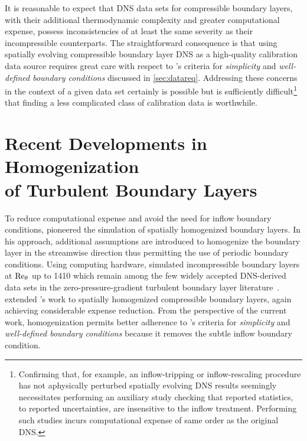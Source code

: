 It is reasonable to expect that DNS data sets for compressible boundary layers,
with their additional thermodynamic complexity and greater computational
expense, possess inconsistencies of at least the same severity as their
incompressible counterparts.
The straightforward consequence is that using spatially evolving compressible
boundary layer DNS as a high-quality calibration data source requires great care
with respect to \citeauthor{Settles1993Hypersonic}'s criteria for
\emph{simplicity} and \emph{well-defined boundary conditions} discussed in
\autoref{sec:datareq}.  Addressing these concerns in the context of a given
data set certainly is possible but is sufficiently difficult\footnote{%
    Confirming that, for example, an inflow-tripping or inflow-rescaling
    procedure has not aphysically perturbed spatially evolving DNS results
    seemingly necessitates performing an auxiliary study checking that reported
    statistics, to reported uncertainties, are insensitive to the
    inflow treatment.  Performing such studies incurs computational expense of
    same order as the original DNS.
}
that finding a less complicated class of calibration data is worthwhile.


\section[Recent Developments in Homogenization of Turbulent Boundary Layers]
        {Recent Developments in Homogenization\\of Turbulent Boundary Layers}
\label{sec:background_homogenization}

To reduce computational expense and avoid the need for inflow boundary conditions,
\citet{Spalart1988Direct} pioneered the simulation of
spatially homogenized boundary layers.  In his approach, additional
assumptions are introduced to homogenize the boundary layer in the
streamwise direction thus permitting the use of periodic boundary conditions.
Using
\citeyear{Spalart1988Direct} computing hardware,
\citeauthor{Spalart1988Direct} simulated incompressible boundary layers at $\Reynolds[\theta]{}$
up to 1410 which remain among the few widely accepted DNS-derived data sets in the
zero-pressure-gradient turbulent boundary layer
literature~\citep{Honkan1997Vorticity,Wu2009Direct}.
\citet{Guarini1998} extended \citeauthor{Spalart1988Direct}'s work to
spatially homogenized compressible boundary layers, again achieving
considerable expense reduction.  From the perspective of
the current work, homogenization permits better adherence to
\citeauthor{Settles1993Hypersonic}'s criteria for \emph{simplicity} and
\emph{well-defined boundary conditions} because it removes the subtle inflow
boundary condition.


